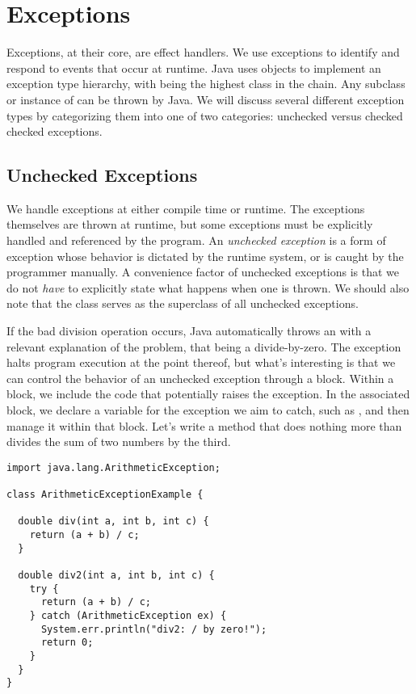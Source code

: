 \section{Exceptions}

Exceptions, at their core, are effect handlers. We use exceptions to identify and respond to events that occur at runtime. Java uses objects to implement an exception type hierarchy, with  being the highest class in the chain. Any subclass or instance of  can be thrown by Java. We will discuss several different exception types by categorizing them into one of two categories: unchecked versus checked checked exceptions.

\subsection{Unchecked Exceptions}
We handle exceptions at either compile time or runtime. The exceptions themselves are thrown at runtime, but some exceptions must be explicitly handled and referenced by the program. An \emph{unchecked exception} is a form of exception whose behavior is dictated by the runtime system, or is caught by the programmer manually. A convenience factor of unchecked exceptions is that we do not \emph{have} to explicitly state what happens when one is thrown. We should also note that the  class serves as the superclass of all unchecked exceptions.

If the bad division operation occurs, Java automatically throws an  with a relevant explanation of the problem, that being a divide-by-zero. 
The exception halts program execution at the point thereof, but what's interesting is that we can control the behavior of an unchecked exception through a  block. 
Within a  block, we include the code that potentially raises the exception. 
In the associated  block, we declare a variable for the exception we aim to catch, such as , and then manage it within that block.
Let's write a method that does nothing more than divides the sum of two numbers by the third.

\begin{lstlisting}[language=MyJava]
import java.lang.ArithmeticException;

class ArithmeticExceptionExample {
  
  double div(int a, int b, int c) {
    return (a + b) / c;
  }

  double div2(int a, int b, int c) {
    try {
      return (a + b) / c;
    } catch (ArithmeticException ex) {
      System.err.println("div2: / by zero!");
      return 0;
    }
  }
} 
\end{lstlisting}

